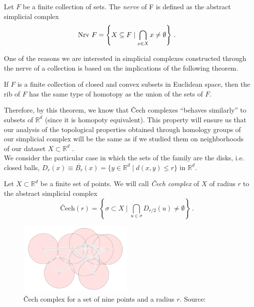 \documentclass[../main.tex]{subfiles}
\begin{document}
\begin{definition}
Let $F$ be a finite collection of sets. The \emph{nerve} of F is defined as the abstract simplicial complex
\[
{\rm Nrv}\ F= \left\{ X \subseteq F \mid \bigcap_{x\in X} x \neq \emptyset \right\}\,.
\]
\end{definition}

One of the reasons we are interested in simplicial complexes constructed through the nerve of a collection is based on the implications of the following theorem.

\begin{theorem}
If $F$ is a finite collection of closed and convex subsets in Euclidean space, then the rib of $F$ has the same type of homotopy as the union of the sets of $F$.
\end{theorem}
Therefore, by this theorem, we know that \v{C}ech complexes ``behaves similarly'' to subsets of $\mathbb{R}^d$ (since it is homopoty equivalent). This property will ensure us that our analysis of the topological properties obtained through homology groups of our simplicial complex will be the same as if we studied them on neighborhoods of our dataset $X\subset \mathbb{R}^d$ \cite{doherty_cech_nodate}. \\

We consider the particular case in which the sets of the family are the disks, i.e. closed balls, $D_r(x)\equiv\overline{B_r}(x)= \{y\in \mathbb{R}^d \mid d(x, y) \leq r\}$ in $\mathbb{R}^d$.

\begin{definition}
Let $X\subset \mathbb{R}^d$ be a finite set of points. We will call \emph{\v{C}ech complex} of $X$ of radius $r$ to the abstract simplicial complex
\[
\text{\v{C}ech}(r)=\left\{\sigma \subset X \mid \bigcap_{u \in \sigma} D_{r/2}(u)\neq \emptyset \right\}\,.
\]
\end{definition}

\begin{figure}[!ht]
\centering
\includegraphics[width=0.5\textwidth]{figures/bg/Cech.png} 
\caption{\v{C}ech complex for a set of nine points and a radius $r$. Source: \cite{edelsbrunner_computational_2010}}
\label{ref:cech}
\end{figure}
\end{document}
